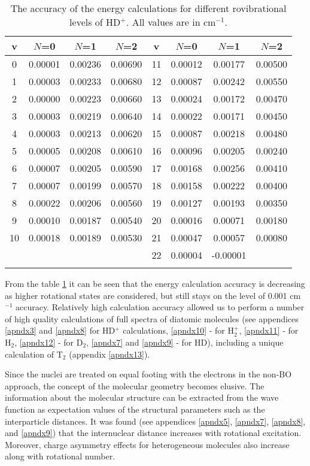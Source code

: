 \begin{table}[t]
\caption{The accuracy of the energy calculations for different
rovibrational levels of HD$^+$. All values are in cm$^{-1}$.}
\centering
\def\arraystretch{1.}
\setlength{\tabcolsep}{.75em}
\begin{tabular}{c c c c | c c c c}
\hline \hline
v & $N$=0 & $N$=1 & $N$=2 & v & $N$=0 & $N$=1 & $N$=2  \\
\hline
0	&	0.00001	&	0.00236	&	0.00690	& 11	&	0.00012	&	0.00177	&	0.00500	\\
1	&	0.00003	&	0.00233	&	0.00680	& 12	&	0.00087	&	0.00242	&	0.00550	\\
2	&	0.00000	&	0.00223	&	0.00660	& 13	&	0.00024	&	0.00172	&	0.00470	\\
3	&	0.00003	&	0.00219	&	0.00640	& 14	&	0.00022	&	0.00171	&	0.00450	\\
4	&	0.00003	&	0.00213	&	0.00620	& 15	&	0.00087	&	0.00218	&	0.00480	\\
5	&	0.00005	&	0.00208	&	0.00610	& 16	&	0.00096	&	0.00205	&	0.00240	\\
6	&	0.00007	&	0.00205	&	0.00590	& 17	&	0.00168	&	0.00256	&	0.00410	\\
7	&	0.00007	&	0.00199	&	0.00570	& 18	&	0.00158	&	0.00222	&	0.00400	\\
8	&	0.00022	&	0.00206	&	0.00560	& 19	&	0.00127	&	0.00193	&	0.00350	\\
9	&	0.00010	&	0.00187	&	0.00540	& 20	&	0.00016	&	0.00071	&	0.00180	\\
10	&	0.00018	&	0.00189	&	0.00530	& 21	&	0.00047	&	0.00057	&	0.00080	\\
    &            &           &           & 22	&	0.00004	&	-0.00001	&	     \\
\hline
\label{table_energy}
\end{tabular}
\end{table}

From the table \ref{table_energy} it can be seen that the energy calculation
accuracy is decreasing as higher rotational states are considered, but still
stays on the level of 0.001 cm$^{-1}$ accuracy.
Relatively high calculation accuracy allowed us to perform a number
of high quality calculations of full spectra of diatomic molecules
(see appendices \ref{apndx3} and \ref{apndx8} for HD$^+$ calculations, 
\ref{apndx10} - for H$_2^+$, \ref{apndx11} - for H$_2$, \ref{apndx12} - 
for D$_2$, \ref{apndx7} and \ref{apndx9} - for HD), including 
a unique calculation of T$_2$ (appendix \ref{apndx13}). 

Since the nuclei are treated on equal footing with the electrons in the non-BO approach, 
the concept of the molecular geometry becomes elusive. The information about the molecular
structure can be extracted from the wave function as expectation values of the structural
parameters such as the interparticle distances. It was found (see appendices \ref{apndx5},
\ref{apndx7}, \ref{apndx8}, and \ref{apndx9}) that the internuclear distance increases
with rotational excitation. Moreover, charge asymmetry effects for heterogeneous molecules
also increase along with rotational number. 


